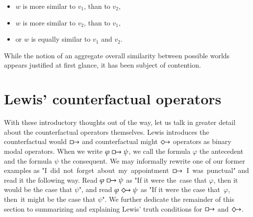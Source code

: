 \documentclass[a4paper,american,10pt]{paper}
\theoremstyle{definition}\newtheorem{definition}{Definition}
\begin{document}
\begin{itemize}
\item $w$ is more similar to $v_1$, than to $v_2$,
\item $w$ is more similar to $v_2$, than to $v_1$,
\item or $w$ is equally similar to $v_1$ and $v_2$.
\end{itemize}
While the notion of an aggregate overall similarity between possible worlds appears justified at first glance, it has been subject of contention. \cite{morreau_overall_similarity_2010}
\section{Lewis' counterfactual operators}
With these introductory thoughts out of the way, let us talk in greater detail about the counterfactual operators themselves. Lewis introduces the counterfactual would $\boxright$ and counterfactual might $\Diamondright$ operators as binary modal operators. \cite{lewis_counterfactuals_1973} When we write $\varphi\boxright\psi$, we call the formula $\varphi$ the antecedent and the formula $\psi$ the consequent. We may informally rewrite one of our former examples as "I~did~not~forget~about~my~appointment~$\boxright$~I~was~punctual" and read it the following way. Read $\varphi\boxright\psi$ as "If it were the~case that $\varphi$, then it would be the case that $\psi$", and read $\varphi\Diamondright\psi$ as "If it were the case that~$\varphi$, then~it might be the case that $\psi$". We further dedicate the remainder of this section to summarizing and explaining Lewis' truth conditions for $\boxright$ and $\Diamondright$.\\
\end{document}

